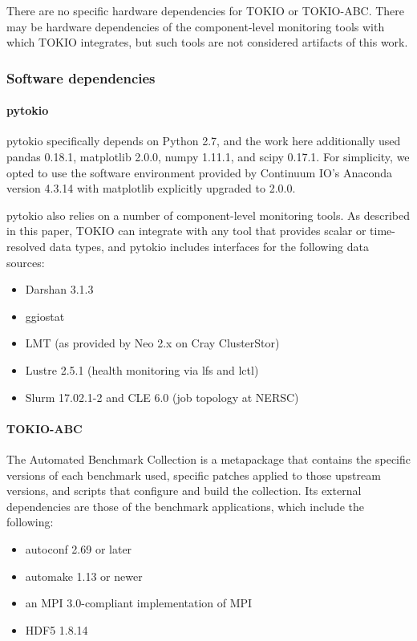 There are no specific hardware dependencies for TOKIO or TOKIO-ABC.
There may be hardware dependencies of the component-level monitoring tools with which TOKIO integrates, but such tools are not considered artifacts of this work.

\subsubsection{Software dependencies}

\paragraph{pytokio}

pytokio specifically depends on Python 2.7, and the work here additionally used pandas 0.18.1, matplotlib 2.0.0, numpy 1.11.1, and scipy 0.17.1.
For simplicity, we opted to use the software environment provided by Continuum IO's Anaconda version 4.3.14 with matplotlib explicitly upgraded to 2.0.0.

pytokio also relies on a number of component-level monitoring tools.
As described in this paper, TOKIO can integrate with any tool that provides scalar or time-resolved data types, and pytokio includes interfaces for the following data sources:

\begin{itemize}
\item Darshan 3.1.3 %
\item ggiostat
\item LMT (as provided by Neo 2.x on Cray ClusterStor) %
\item Lustre 2.5.1 (health monitoring via lfs and lctl)
\item Slurm 17.02.1-2 and CLE 6.0 (job topology at NERSC)
\end{itemize}

\paragraph{TOKIO-ABC} The Automated Benchmark Collection is a metapackage that contains the specific versions of each benchmark used, specific patches applied to those upstream versions, and scripts that configure and build the collection.
Its external dependencies are those of the benchmark applications, which include the following:

\begin{itemize}
\item autoconf 2.69 or later
\item automake 1.13 or newer
\item an MPI 3.0-compliant implementation of MPI
\item HDF5 1.8.14
\end{itemize}


